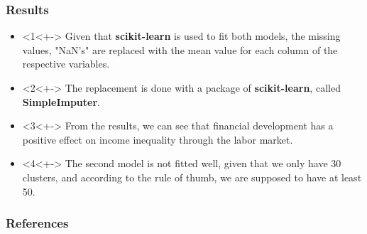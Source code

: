 \documentclass[11pt]{beamer}
\begin{document}
\begin{frame}
\frametitle{Results}
\begin{itemize}
\item<1<+-> Given that \textbf{scikit-learn} is used to fit both models, the missing values, "NaN's" are replaced with the mean value for each column of the respective variables.
\item<2<+-> The replacement is done with a package of \textbf{scikit-learn}, called \textbf{SimpleImputer}.
\item<3<+-> From the results, we can see that financial development has a positive effect on income inequality through the labor market.
\item<4<+-> The second model is not fitted well, given that we only have 30 clusters, and according to the rule of thumb, we are supposed to have at least 50.
\end{itemize}
\end{frame}

 {
    \begin{frame}
        \frametitle{}
    \end{frame}

}

\begin{frame}[allowframebreaks]
    \frametitle{References}

    \renewcommand{\bibfont}{\normalfont\footnotesize}
    \printbibliography

\end{frame}
\end{document}
